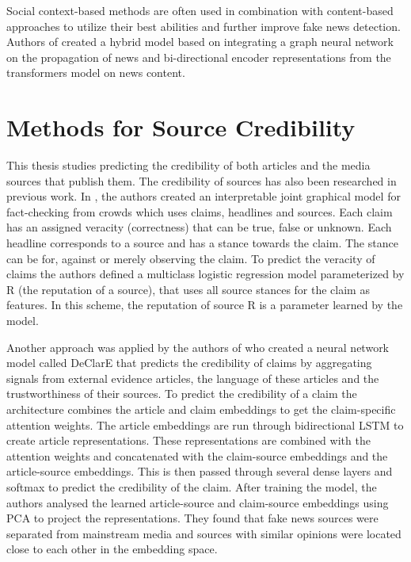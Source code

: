 Social context-based methods are often used in combination with content-based approaches to utilize their best abilities and further improve fake news detection. Authors of \cite{hybrid} created a hybrid model based on integrating a graph neural network on the propagation of news and bi-directional encoder representations from the transformers model on news content. 

\section{Methods for Source Credibility}
This thesis studies predicting the credibility of both articles and the media sources that publish them. The credibility of sources has also been researched in previous work. In \cite{source-reputation}, the authors created an interpretable joint graphical model for fact-checking from crowds which uses claims, headlines and sources. Each claim has an assigned veracity (correctness) that can be true, false or unknown. Each headline corresponds to a source and has a stance towards the claim. The stance can be for, against or merely observing the claim. To predict the veracity of claims the authors defined a multiclass logistic regression model parameterized by R (the reputation of a source), that uses all source stances for the claim as features. In this scheme, the reputation of source R is a parameter learned by the model.

Another approach was applied by the authors of \cite{declare} who created a neural network model called DeClarE that predicts the credibility of claims by aggregating signals from external evidence articles, the language of these articles and the trustworthiness of their sources. To predict the credibility of a claim the architecture combines the article and claim embeddings to get the claim-specific attention weights. The article embeddings are run through bidirectional LSTM to create article representations. These representations are combined with the attention weights and concatenated with the claim-source embeddings and the article-source embeddings. This is then passed through several dense layers and softmax to predict the credibility of the claim. After training the model, the authors analysed the learned article-source and claim-source embeddings using PCA to project the representations. They found that fake news sources were separated from mainstream media and sources with similar opinions were located close to each other in the embedding space.

